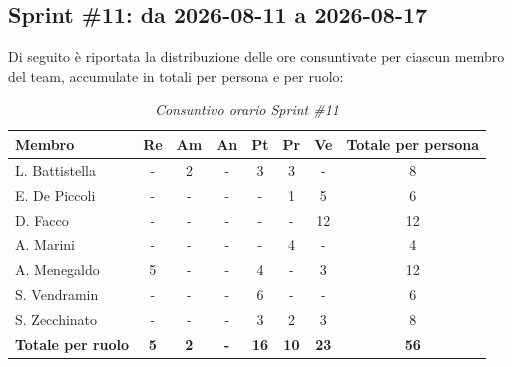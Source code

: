 ﻿\documentclass[a4paper, 10pt, colorlinks=true, linkcolor=black, urlcolor=blue, citecolor=blue, hidelinks]{article}
\renewcommand{\arraystretch}{1.2}
\begin{document}
\subsection{Sprint \#11: da 2026-08-11 a 2026-08-17}
Di seguito è riportata la distribuzione delle ore consuntivate per ciascun membro del team, accumulate in totali per persona e per ruolo:

\begin{table}[H]
    \centering
    \renewcommand{\arraystretch}{1.4}
    \begin{tabular}{|l|c|c|c|c|c|c|c|}
        \hline
        \rowcolor{bluBitless!15}
        \textbf{Membro} & \textbf{Re} & \textbf{Am} & \textbf{An} & \textbf{Pt} & \textbf{Pr} & \textbf{Ve} & \textbf{Totale per persona} \\
        \hline
        L. Battistella & - & 2 & - & 3 & 3 & - & 8 \\ \hline
        E. De Piccoli & - & - & - & - & 1 & 5 & 6 \\ \hline
        D. Facco & - & - & - & - & - & 12 & 12 \\ \hline
        A. Marini & - & - & - & - & 4 & - & 4 \\ \hline
        A. Menegaldo & 5 & - & - & 4 & - & 3 & 12 \\ \hline
        S. Vendramin & - & - & - & 6 & - & - & 6 \\ \hline
        S. Zecchinato & - & - & - & 3 & 2 & 3 & 8 \\ \hline
        \rowcolor{bluBitless!8}
        \textbf{Totale per ruolo} & \textbf{5} & \textbf{2} & \textbf{-} & \textbf{16} & \textbf{10} & \textbf{23} & \textbf{56} \\
        \hline
    \end{tabular}
    \caption{\textit{Consuntivo orario Sprint \#11}}
\end{table}
\end{document}
